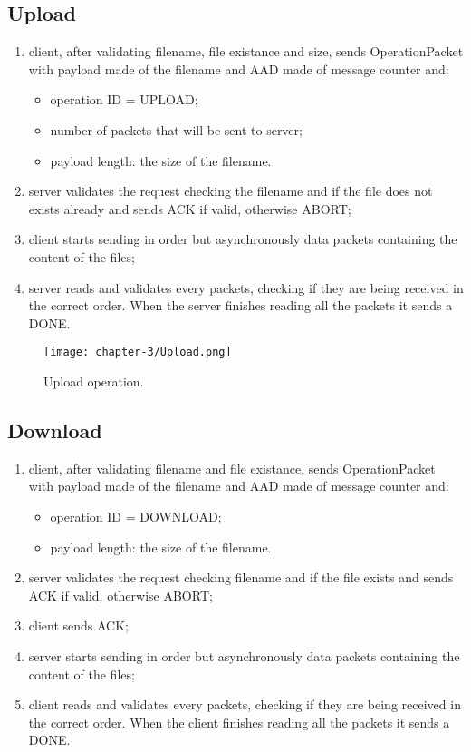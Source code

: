 \subsection{Upload}
\begin{enumerate} 
	\item client, after validating filename, file existance and size, sends OperationPacket with payload made of the filename and AAD made of message counter and: \newline{}
	\begin{itemize}
		\item operation ID = UPLOAD;
		\item number of packets that will be sent to server;
		\item payload length: the size of the filename.
	\end{itemize}
	\item server validates the request checking the filename and if the file does not exists already and sends ACK if valid, otherwise ABORT;
	\item client starts sending in order but asynchronously data packets containing the content of the files;
	\item server reads and validates every packets, checking if they are being received in the correct order. When the server finishes reading all the packets it sends a DONE.

\end{enumerate}

\begin{figure}[!h] 
    \centering 
    \texttt{[image: chapter-3/Upload.png]} 
    \caption{Upload operation.}
    \label{fig:upload_operation}
\end{figure}

\newpage{}

\subsection{Download}
\begin{enumerate}
	\item client, after validating filename and file existance, sends OperationPacket with payload made of the filename and AAD made of message counter and: \newline{}
	\begin{itemize}
		\item operation ID = DOWNLOAD;
		\item payload length: the size of the filename.
	\end{itemize}
	\item server validates the request checking filename and if the file exists and sends ACK if valid, otherwise ABORT;
	\item client sends ACK;
	\item server starts sending in order but asynchronously data packets containing the content of the files;
	\item client reads and validates every packets, checking if they are being received in the correct order. When the client finishes reading all the packets it sends a DONE.
\end{enumerate}

